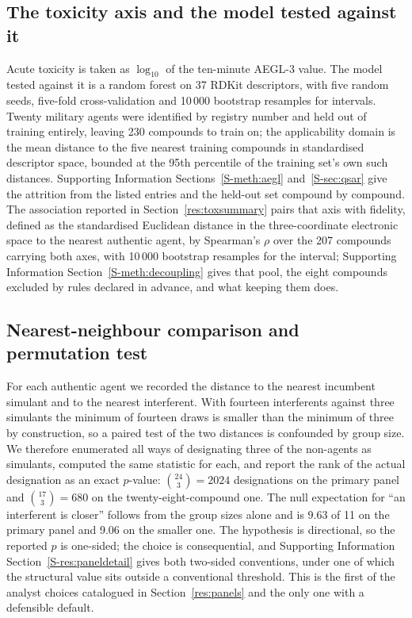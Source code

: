 \documentclass[journal=ancham,manuscript=article,margin=1in]{achemso}
\begin{document}
\subsection{The toxicity axis and the model tested against it}
\label{meth:tox}
Acute toxicity is taken as $\log_{10}$ of the ten-minute AEGL-3 value. The
model tested against it is a random forest on 37 RDKit descriptors, with five
random seeds, five-fold cross-validation and 10\,000 bootstrap resamples for
intervals. Twenty military agents were identified by registry number and held
out of training entirely, leaving 230 compounds to train on; the applicability
domain is the mean distance to the five nearest training compounds in
standardised descriptor space, bounded at the 95th percentile of the training
set's own such distances. Supporting Information
Sections~\ref{S-meth:aegl} and~\ref{S-sec:qsar} give the attrition from the
listed entries and the held-out set compound by compound. The association
reported in Section~\ref{res:toxsummary} pairs that axis with fidelity, defined
as the standardised Euclidean distance in the three-coordinate electronic space
to the nearest authentic agent, by Spearman's $\rho$ over the 207 compounds
carrying both axes, with 10\,000 bootstrap resamples for the interval;
Supporting Information Section~\ref{S-meth:decoupling} gives that pool, the
eight compounds excluded by rules declared in advance, and what keeping them
does.

\subsection{Nearest-neighbour comparison and permutation test}
\label{sec:perm}
For each authentic agent we recorded the distance to the nearest incumbent
simulant and to the nearest interferent. With fourteen interferents against
three simulants the minimum of fourteen draws is smaller than the minimum of
three by construction, so a paired test of the two distances is confounded by
group size. We therefore enumerated all ways of designating three of the
non-agents as simulants, computed the same statistic for each, and report the
rank of the actual designation as an exact $p$-value: $\binom{24}{3}=2024$
designations on the primary panel and $\binom{17}{3}=680$ on the
twenty-eight-compound one. The null expectation for ``an interferent is closer''
follows from the group sizes alone and is 9.63 of 11 on the primary panel and
9.06 on the smaller one. The hypothesis is directional, so the reported $p$ is
one-sided; the choice is consequential, and Supporting Information
Section~\ref{S-res:paneldetail} gives both two-sided conventions, under one of
which the structural value sits outside a conventional threshold. This is the
first of the analyst choices catalogued in Section~\ref{res:panels} and the only
one with a defensible default.
\end{document}
